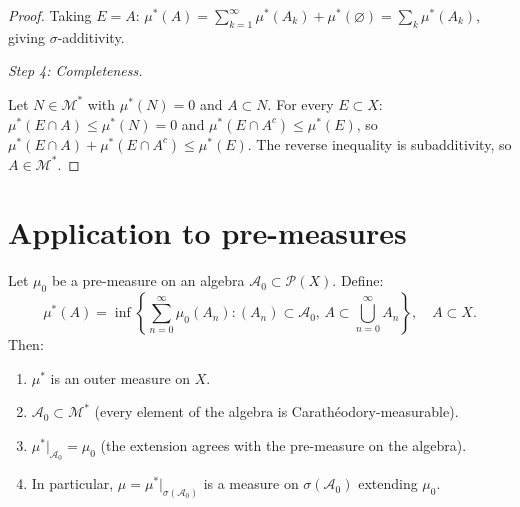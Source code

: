 \begin{proof}
Taking $E = A$: $\mu^*(A) = \sum_{k=1}^{\infty} \mu^*(A_k) + \mu^*(\varnothing)
= \sum_k \mu^*(A_k)$, giving $\sigma$-additivity.

\emph{Step 4: Completeness.}

Let $N \in \mathcal{M}^*$ with $\mu^*(N) = 0$ and $A \subset N$. For every
$E \subset X$: $\mu^*(E \cap A) \leq \mu^*(N) = 0$ and $\mu^*(E \cap A^c) \leq
\mu^*(E)$, so $\mu^*(E \cap A) + \mu^*(E \cap A^c) \leq \mu^*(E)$. The reverse
inequality is subadditivity, so $A \in \mathcal{M}^*$.
\end{proof}

\section{Application to pre-measures}

\begin{theorem}
\label{thm:caratheodory_extension}
Let $\mu_0$ be a pre-measure on an algebra $\mathcal{A}_0 \subset \mathcal{P}(X)$.
Define:
\[
\mu^*(A) = \inf\left\{\sum_{n=0}^{\infty} \mu_0(A_n) :
(A_n) \subset \mathcal{A}_0,\, A \subset \bigcup_{n=0}^{\infty} A_n\right\},
\quad A \subset X.
\]
Then:
\begin{enumerate}
    \item $\mu^*$ is an outer measure on $X$.
    \item $\mathcal{A}_0 \subset \mathcal{M}^*$ (every element of the algebra is
    Carath\'eodory-measurable).
    \item $\mu^*|_{\mathcal{A}_0} = \mu_0$ (the extension agrees with the
    pre-measure on the algebra).
    \item In particular, $\mu = \mu^*|_{\sigma(\mathcal{A}_0)}$ is a measure on
    $\sigma(\mathcal{A}_0)$ extending $\mu_0$.
\end{enumerate}
\end{theorem}

